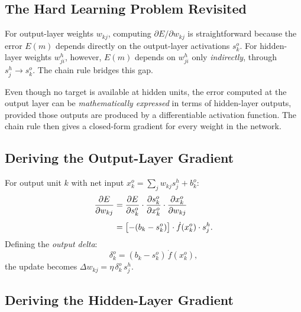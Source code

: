 \documentclass[12pt,a4paper]{article}
\begin{document}
\subsection{The Hard Learning Problem Revisited}
\label{subsec:hard-learning}

For output-layer weights $w_{kj}$, computing $\partial E / \partial w_{kj}$
is straightforward because the error $E(m)$ depends directly on the
output-layer activations $s_k^o$.  For hidden-layer weights $w_{ji}^h$,
however, $E(m)$ depends on $w_{ji}^h$ only \emph{indirectly}, through
$s_j^h \to s_k^o$.  The chain rule bridges this gap.

\begin{keyinsight}[title=The Core Idea of Backpropagation]
  Even though no target is available at hidden units, the error computed at
  the output layer can be \emph{mathematically expressed} in terms of
  hidden-layer outputs, provided those outputs are produced by a differentiable
  activation function.  The chain rule then gives a closed-form gradient for
  every weight in the network.
\end{keyinsight}

\subsection{Deriving the Output-Layer Gradient}
\label{subsec:output-gradient}

For output unit $k$ with net input $x_k^o = \sum_j w_{kj} s_j^h + b_k^o$:
\begin{align}
  \frac{\partial E}{\partial w_{kj}}
    &= \frac{\partial E}{\partial s_k^o}
       \cdot\frac{\partial s_k^o}{\partial x_k^o}
       \cdot\frac{\partial x_k^o}{\partial w_{kj}} \notag \\[4pt]
    &= \bigl[-(b_k - s_k^o)\bigr]
       \cdot \dot{f}(x_k^o)
       \cdot s_j^h.
  \label{eq:output-grad}
\end{align}
Defining the \emph{output delta}:
\begin{equation}
  \delta_k^o = (b_k - s_k^o)\,\dot{f}(x_k^o),
  \label{eq:delta-output}
\end{equation}
the update becomes $\Delta w_{kj} = \eta\,\delta_k^o\,s_j^h$.

\subsection{Deriving the Hidden-Layer Gradient}
\label{subsec:hidden-gradient}
\end{document}
